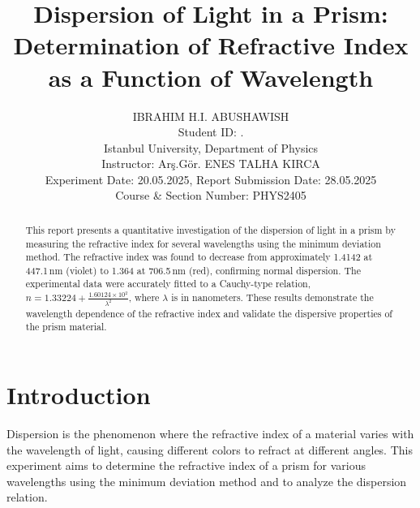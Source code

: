 \documentclass[journal]{IEEEtran}
\begin{document}
\title{Dispersion of Light in a Prism: Determination of Refractive Index as a Function of Wavelength}
\author{IBRAHIM H.I. ABUSHAWISH \\

{\small Student ID: \hspace{1.5cm}. \\ 
Istanbul University, Department of Physics \\
Instructor: Arş.Gör. ENES TALHA KIRCA\\
Experiment Date: 20.05.2025, Report Submission Date: 28.05.2025 \\
Course \& Section Number: PHYS2405}}


\maketitle
\begin{abstract}
    This report presents a quantitative investigation of the dispersion of light in a prism by measuring the refractive index for several wavelengths using the minimum deviation method. The refractive index was found to decrease from approximately 1.4142 at 447.1\,nm (violet) to 1.364 at 706.5\,nm (red), confirming normal dispersion. The experimental data were accurately fitted to a Cauchy-type relation, \( n = 1.33224 + \frac{1.60124 \times 10^2}{\lambda^2} \), where \( \lambda \) is in nanometers. These results demonstrate the wavelength dependence of the refractive index and validate the dispersive properties of the prism material.
\end{abstract}

\section{Introduction}
Dispersion is the phenomenon where the refractive index of a material varies with the wavelength of light, causing different colors to refract at different angles. This experiment aims to determine the refractive index of a prism for various wavelengths using the minimum deviation method and to analyze the dispersion relation.
\end{document}
